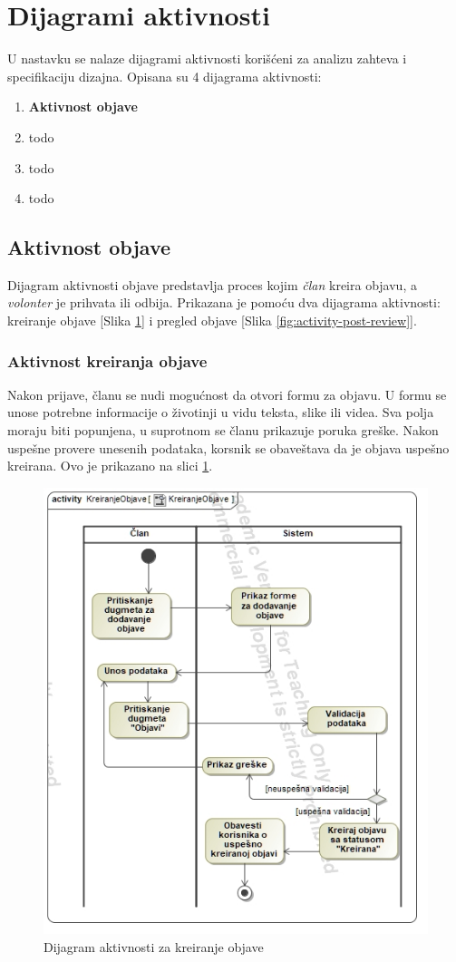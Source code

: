 \section{Dijagrami aktivnosti}
\par U nastavku se nalaze dijagrami aktivnosti korišćeni za analizu zahteva i specifikaciju dizajna.
Opisana su 4 dijagrama aktivnosti:
\begin{enumerate}
    \item \textbf{Aktivnost objave}
    \item todo
    \item todo
    \item todo
\end{enumerate}
\subsection{Aktivnost objave}
\par Dijagram aktivnosti objave predstavlja proces kojim \textit{član} kreira objavu, a \textit{volonter} je prihvata ili odbija.
Prikazana je pomoću dva dijagrama aktivnosti: kreiranje objave [Slika \ref{fig:activity-create-post}] i pregled objave [Slika \ref{fig:activity-post-review}].
\subsubsection*{Aktivnost kreiranja objave}
\par Nakon prijave, članu se nudi mogućnost da otvori formu za objavu. U formu se unose potrebne informacije o životinji u vidu teksta, slike ili videa.
Sva polja moraju biti popunjena, u suprotnom se članu prikazuje poruka greške. Nakon uspešne provere unesenih podataka, korsnik se obaveštava da je 
objava uspešno kreirana. Ovo je prikazano na slici \ref{fig:activity-create-post}.
\begin{figure}[h]
    \centering
    \includegraphics[width=\textwidth, height=0.75\textwidth]{img/activity-create-post.jpg}
    \caption{Dijagram aktivnosti za kreiranje objave}
    \label{fig:activity-create-post}
\end{figure}
